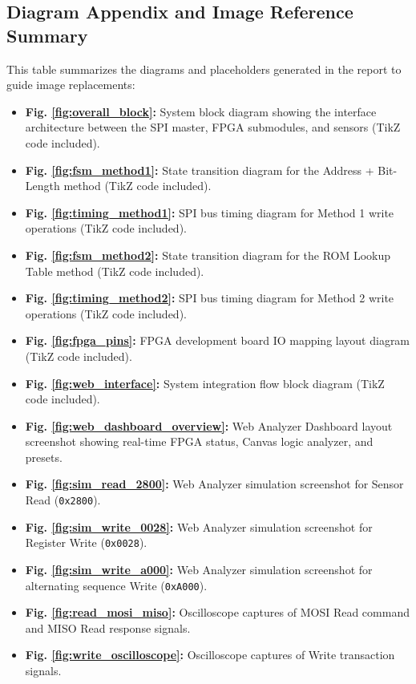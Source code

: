 \documentclass[conference]{IEEEtran}
\begin{document}
\subsection{Diagram Appendix and Image Reference Summary}
This table summarizes the diagrams and placeholders generated in the report to guide image replacements:
\begin{itemize}
    \item \textbf{Fig. \ref{fig:overall_block}:} System block diagram showing the interface architecture between the SPI master, FPGA submodules, and sensors (TikZ code included).
    \item \textbf{Fig. \ref{fig:fsm_method1}:} State transition diagram for the Address + Bit-Length method (TikZ code included).
    \item \textbf{Fig. \ref{fig:timing_method1}:} SPI bus timing diagram for Method 1 write operations (TikZ code included).
    \item \textbf{Fig. \ref{fig:fsm_method2}:} State transition diagram for the ROM Lookup Table method (TikZ code included).
    \item \textbf{Fig. \ref{fig:timing_method2}:} SPI bus timing diagram for Method 2 write operations (TikZ code included).
    \item \textbf{Fig. \ref{fig:fpga_pins}:} FPGA development board IO mapping layout diagram (TikZ code included).
    \item \textbf{Fig. \ref{fig:web_interface}:} System integration flow block diagram (TikZ code included).
    \item \textbf{Fig. \ref{fig:web_dashboard_overview}:} Web Analyzer Dashboard layout screenshot showing real-time FPGA status, Canvas logic analyzer, and presets.
    \item \textbf{Fig. \ref{fig:sim_read_2800}:} Web Analyzer simulation screenshot for Sensor Read (\texttt{0x2800}).
    \item \textbf{Fig. \ref{fig:sim_write_0028}:} Web Analyzer simulation screenshot for Register Write (\texttt{0x0028}).
    \item \textbf{Fig. \ref{fig:sim_write_a000}:} Web Analyzer simulation screenshot for alternating sequence Write (\texttt{0xA000}).
    \item \textbf{Fig. \ref{fig:read_mosi_miso}:} Oscilloscope captures of MOSI Read command and MISO Read response signals.
    \item \textbf{Fig. \ref{fig:write_oscilloscope}:} Oscilloscope captures of Write transaction signals.

\end{itemize}
\end{document}
